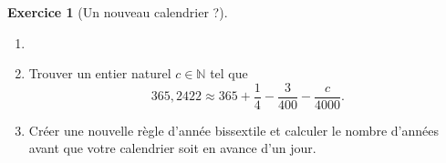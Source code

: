 \documentclass[a4paper, 14pt]{extarticle}
\theoremstyle{plain}
\theoremstyle{definition}
\newtheorem{ex}{Exercice}
\newcommand{\N}{\mathbb{N}}
\begin{document}
\begin{ex}[Un nouveau calendrier ?]

	\begin{enumerate}
		\item[]
		\item
		Trouver un entier naturel $c \in \N$ tel que
			\[ 365{,}2422 \approx 365 + \dfrac14 - \dfrac{3}{400} - \dfrac{c}{4000}.\]

		\item  Créer une nouvelle règle d'année bissextile et calculer le nombre d'années avant que votre calendrier soit en avance d'un jour.
	\end{enumerate}

\end{ex}

\vfill
\nocite{*}
\printbibliography[title={Référence}]
\end{document}
